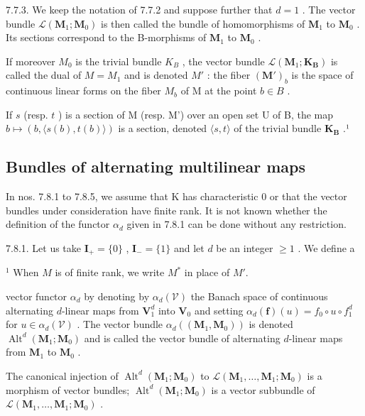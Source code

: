 7.7.3. We keep the notation of 7.7.2 and suppose further that \(d=1\) . The vector bundle \(\mathcal{L}(\mathbf{M}_{1};\mathbf{M}_{0})\) is then called the bundle of homomorphisms of \(\mathbf{M}_{1}\) to \(\mathbf{M}_{0}\) . Its sections correspond to the B-morphisms of \(\mathbf{M}_{1}\) to \(\mathbf{M}_{0}\) .

If moreover \(M_{0}\) is the trivial bundle \(K_{B}\) , the vector bundle \(\mathcal{L}(\mathbf{M}_{1};\mathbf{K}_{\mathbf{B}})\) is called the dual of \(M = M_{1}\) and is denoted \(M'\) : the fiber \((\mathbf{M}')_{b}\) is the space of continuous linear forms on the fiber \(M_{b}\) of M at the point \(b \in B\) .

If \(s\) (resp. \(t\) ) is a section of M (resp. M') over an open set U of B, the map \(b \mapsto (b, \langle s(b), t(b) \rangle)\) is a section, denoted \(\langle s, t \rangle\) of the trivial bundle \(\mathbf{K}_{\mathbf{B}}\) .¹

\subsection{Bundles of alternating multilinear maps}

In nos. 7.8.1 to 7.8.5, we assume that K has characteristic 0 or that the vector bundles under consideration have finite rank. It is not known whether the definition of the functor \(\alpha_{d}\) given in 7.8.1 can be done without any restriction.

7.8.1. Let us take \(\mathbf{I}_{+} = \{0\}\) , \(\mathbf{I}_{-} = \{1\}\) and let \(d\) be an integer \(\geqslant 1\) . We define a

\(^{1}\) When \(M\) is of finite rank, we write \(M^{*}\) in place of \(M'\).

vector functor \(\alpha_{d}\) by denoting by \(\alpha_{d}(\mathcal{V})\) the Banach space of continuous alternating \(d\)-linear maps from \(\mathbf{V}_{1}^{d}\) into \(\mathbf{V}_{0}\) and setting \(\alpha_{d}(\mathbf{f})(u) = f_{0} \circ u \circ f_{1}^{d}\) for \(u \in \alpha_{d}(\mathcal{V})\) . The vector bundle \(\alpha_{d}((\mathbf{M}_{1}, \mathbf{M}_{0}))\) is denoted \(\operatorname{Alt}^{d}(\mathbf{M}_{1}; \mathbf{M}_{0})\) and is called the vector bundle of alternating \(d\)-linear maps from \(\mathbf{M}_{1}\) to \(\mathbf{M}_{0}\) .

The canonical injection of \(\operatorname{Alt}^{d}(\mathbf{M}_{1};\mathbf{M}_{0})\) to \(\mathcal{L}(\mathbf{M}_{1},\ldots,\mathbf{M}_{1};\mathbf{M}_{0})\) is a morphism of vector bundles; \(\operatorname{Alt}^{d}(\mathbf{M}_{1};\mathbf{M}_{0})\) is a vector subbundle of \(\mathcal{L}(\mathbf{M}_{1},\ldots,\mathbf{M}_{1};\mathbf{M}_{0})\) .

